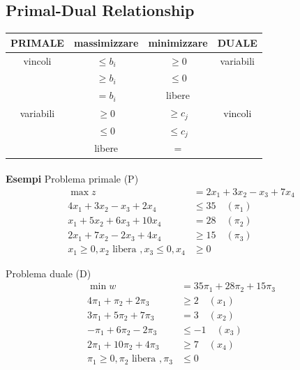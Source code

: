 \documentclass[a4paper, 11pt]{article}
\begin{document}
    \subsection{Primal-Dual Relationship}
        \begin{table}[h!]
            \centering
            \begin{tabular}{|c|c||c|c|}
            \hline
            PRIMALE & massimizzare & minimizzare & DUALE \\
            \hline
            vincoli & $\leq b_i$ & $\geq 0$ & variabili \\
             & $\geq b_i$ & $\leq 0$ & \\
             & $= b_i$ & libere & \\
            \hline
            variabili & $\geq 0$ & $\geq c_j$ & vincoli \\
             & $\leq 0$ & $\leq c_j$ & \\
             & libere & $=$ & \\
            \hline
            \end{tabular}
        \end{table}

        \paragraph{}
        \textbf{Esempi}
        Problema primale (P)
        \begin{align*}
            \max z &= 2x_1 + 3x_2 - x_3 + 7x_4 \\
            4x_1 + 3x_2 - x_3 + 2x_4 &\leq 35 \quad (\pi_1) \\
            x_1 + 5x_2 + 6x_3 + 10x_4 &= 28 \quad (\pi_2) \\
            2x_1 + 7x_2 - 2x_3 + 4x_4 &\geq 15 \quad (\pi_3) \\
            x_1 \geq 0, x_2 \text{ libera }, x_3 \leq 0, x_4 &\geq 0
        \end{align*}
        
        Problema duale (D)
        \begin{align*}
            \min w &= 35\pi_1 + 28\pi_2 + 15\pi_3 \\
            4\pi_1 + \pi_2 + 2\pi_3 &\geq 2 \quad (x_1) \\
            3\pi_1 + 5\pi_2 + 7\pi_3 &= 3 \quad (x_2) \\
            -\pi_1 + 6\pi_2 - 2\pi_3 &\leq -1 \quad (x_3) \\
            2\pi_1 + 10\pi_2 + 4\pi_3 &\geq 7 \quad (x_4) \\
            \pi_1 \geq 0, \pi_2 \text{ libera }, \pi_3 &\leq 0
        \end{align*}
        
\end{document}
